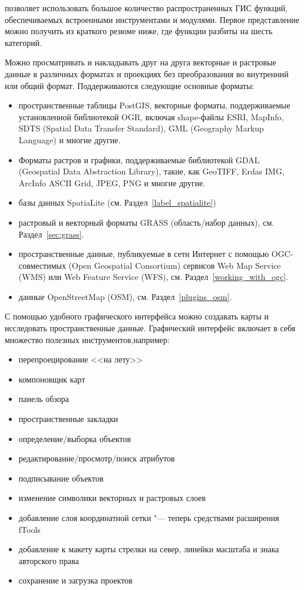 \label{label_majfeat}

\qg позволяет использовать большое количество распространенных ГИС функций,
обеспечиваемых встроенными инструментами и модулями. Первое представление
можно получить из краткого резюме ниже, где функции разбиты на шесть
категорий.


Можно просматривать и накладывать друг на друга векторные и растровые
данные в различных форматах и проекциях без преобразования во внутренний
или общий формат. Поддерживаются следующие основные форматы:

\begin{itemize}[label=--]
\item пространственные таблицы PostGIS, векторные форматы, поддерживаемые
установленной библиотекой OGR, включая shape-файлы ESRI, MapInfo, SDTS
(Spatial Data Transfer Standard), GML (Geography Markup Language) и многие
другие.
\item Форматы растров и графики, поддерживаемые
библиотекой GDAL (Geospatial Data Abstraction Library), такие, как
GeoTIFF, Erdas IMG, ArcInfo ASCII Grid, JPEG, PNG и многие другие.
\item базы данных SpatiaLite (см. Раздел~\ref{label_spatialite})
\item растровый и векторный форматы GRASS (область/набор данных),
см. Раздел~\ref{sec:grass}.
\item пространственные данные, публикуемые в сети Интернет с помощью
OGC-совместимых (Open Geospatial Consortium) сервисов Web Map Service
(WMS) или Web Feature Service (WFS), см. Раздел~\ref{working_with_ogc}.
\item данные OpenStreetMap (OSM), см. Раздел~\ref{plugins_osm}.
\end{itemize}


С помощью удобного графического интерфейса можно создавать карты и
исследовать пространственные данные. Графический интерфейс включает в
себя множество полезных инструментов,например:

\begin{itemize}[label=--]
\item перепроецирование <<на лету>>
\item компоновщик карт
\item панель обзора
\item пространственные закладки
\item определение/выборка объектов
\item редактирование/просмотр/поиск атрибутов
\item подписывание объектов
\item изменение символики векторных и растровых слоев
\item добавление слоя координатной сетки "--- теперь средствами расширения
fTools
\item добавление к макету карты стрелки на север, линейки масштаба
и знака авторского права
\item сохранение и загрузка проектов
\end{itemize}

